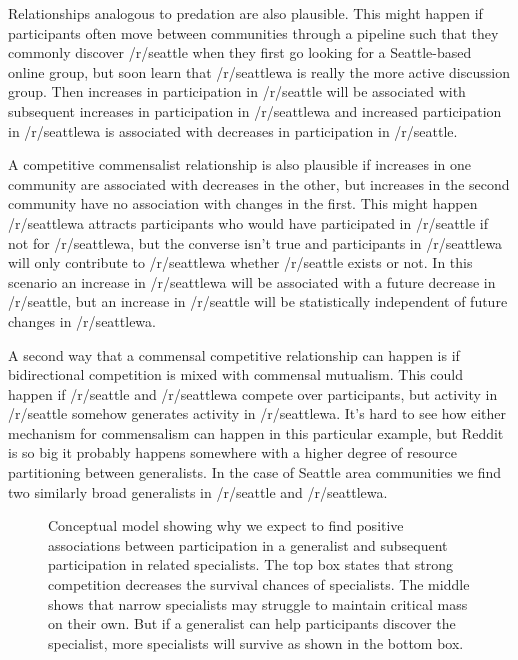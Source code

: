 \documentclass[12pt]{memoir}
\begin{document}
Relationships analogous to predation are also plausible. This might happen if participants often move between communities through a pipeline such that they commonly discover /r/seattle when they first go looking for a Seattle-based online group, but soon learn that /r/seattlewa is really the more active discussion group.   Then increases in participation in /r/seattle will be associated with subsequent increases in participation in /r/seattlewa and increased participation in /r/seattlewa  is associated with decreases in participation in /r/seattle.

A competitive commensalist relationship is also plausible if increases in one community are associated with decreases in the other, but increases in the second community have no association with changes in the first.  This might happen  /r/seattlewa attracts participants who would have participated in /r/seattle if not for /r/seattlewa, but the converse isn't true and participants in /r/seattlewa will only contribute to /r/seattlewa whether /r/seattle exists or not.  In this scenario an increase in /r/seattlewa will be associated with a future decrease in /r/seattle, but an increase in /r/seattle will be statistically independent of future changes in /r/seattlewa.

A second way that a commensal competitive relationship can happen is if bidirectional competition is mixed with commensal mutualism. This could happen if /r/seattle and /r/seattlewa compete over participants, but activity in /r/seattle somehow generates activity in /r/seattlewa. It's hard to see how either mechanism for commensalism can happen in this particular example, but Reddit is so big it probably happens somewhere with a higher degree of resource partitioning between generalists.  In the case of Seattle area communities we find two similarly broad generalists in /r/seattle and /r/seattlewa.

\begin{figure}[t]

\caption{Conceptual model showing why we expect to find positive associations between participation in a generalist and subsequent participation in related specialists.  The top box states that strong competition decreases the survival chances of specialists. The middle shows that narrow specialists may struggle to maintain critical mass on their own. But if a generalist can help participants discover the specialist, more specialists will survive as shown in the bottom box. \label{fig:H2}}
\end{figure}
\end{document}

